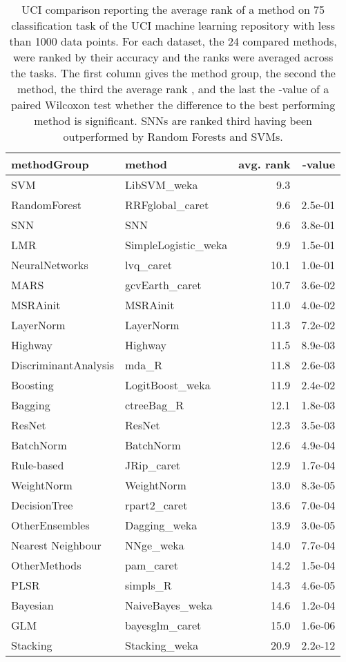 \documentclass{article}
\begin{document}
\begin{table}[ht]
\caption[Method comparison on small UCI data sets]{UCI comparison reporting the average rank
of a method on 75 classification task of the 
UCI machine learning repository with  less than 1000 data points. 
For each dataset, the 24 compared methods, 
were ranked by their
accuracy and the ranks were averaged across the tasks. 
The first column gives the method group, the second the 
method, the third  
the average rank , and the last the -value 
of a paired Wilcoxon test whether the difference to the best performing 
method is significant.
SNNs are ranked third having been outperformed by Random Forests and SVMs.  \label{tab:uciS1}}

\centering
\begin{tabular}{llrr}
  \toprule
 methodGroup & method & avg. rank & -value \\ 
  \midrule
  SVM & LibSVM\_weka &  9.3 &\\ 
  RandomForest & RRFglobal\_caret &  9.6 & 2.5e-01 \\ 
  SNN & SNN &  9.6 & 3.8e-01 \\ 
  LMR & SimpleLogistic\_weka &  9.9 & 1.5e-01 \\ 
  NeuralNetworks & lvq\_caret & 10.1 & 1.0e-01 \\ 
  MARS & gcvEarth\_caret & 10.7 & 3.6e-02 \\ 
  MSRAinit & MSRAinit & 11.0 & 4.0e-02 \\ 
  LayerNorm & LayerNorm & 11.3 & 7.2e-02 \\ 
  Highway & Highway & 11.5 & 8.9e-03 \\ 
  DiscriminantAnalysis & mda\_R & 11.8 & 2.6e-03 \\ 
  Boosting & LogitBoost\_weka & 11.9 & 2.4e-02 \\ 
  Bagging & ctreeBag\_R & 12.1 & 1.8e-03 \\ 
  ResNet & ResNet & 12.3 & 3.5e-03 \\ 
  BatchNorm & BatchNorm & 12.6 & 4.9e-04 \\ 
  Rule-based & JRip\_caret & 12.9 & 1.7e-04 \\ 
  WeightNorm & WeightNorm & 13.0 & 8.3e-05 \\ 
  DecisionTree & rpart2\_caret & 13.6 & 7.0e-04 \\ 
  OtherEnsembles & Dagging\_weka & 13.9 & 3.0e-05 \\ 
  Nearest Neighbour & NNge\_weka & 14.0 & 7.7e-04 \\ 
  OtherMethods & pam\_caret & 14.2 & 1.5e-04 \\ 
  PLSR & simpls\_R & 14.3 & 4.6e-05 \\ 
  Bayesian & NaiveBayes\_weka & 14.6 & 1.2e-04 \\ 
  GLM & bayesglm\_caret & 15.0 & 1.6e-06 \\ 
  Stacking & Stacking\_weka & 20.9 & 2.2e-12 \\ 
   \bottomrule
\end{tabular}
\end{table}
\end{document}
